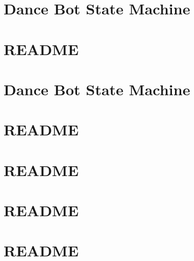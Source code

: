 \documentclass[twoside]{book}
\newcommand{\+}{\discretionary{\mbox{\scriptsize$\hookleftarrow$}}{}{}}
\begin{document}
\chapter{Dance Bot State Machine}
\label{md_smacc_sm_reference_library_sm_dance_bot_2_launch_readme}

\chapter{R\+E\+A\+D\+ME}
\label{md_smacc_sm_reference_library_sm_dance_bot_2_README}

\chapter{Dance Bot State Machine}
\label{md_smacc_sm_reference_library_sm_dance_bot_strikes_back_launch_readme}

\chapter{R\+E\+A\+D\+ME}
\label{md_smacc_sm_reference_library_sm_dance_bot_strikes_back_README}

\chapter{R\+E\+A\+D\+ME}
\label{md_smacc_sm_reference_library_sm_fetch_screw_loop_1_README}

\chapter{R\+E\+A\+D\+ME}
\label{md_smacc_sm_reference_library_sm_fetch_six_table_pick_n_sort_1_README}

\chapter{R\+E\+A\+D\+ME}
\label{md_smacc_sm_reference_library_sm_fetch_two_table_pick_n_place_1_README}

\end{document}
